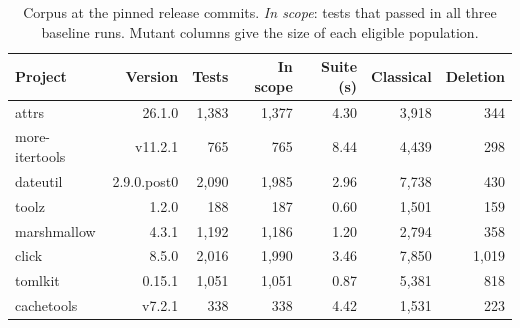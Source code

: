 \begin{table}[t]
\centering\small
\begin{tabular}{lrrrrrr}
\toprule
Project & Version & Tests & In scope & Suite (s) & Classical & Deletion \\
\midrule
attrs & 26.1.0 & 1,383 & 1,377 & 4.30 & 3,918 & 344 \\
more-itertools & v11.2.1 & 765 & 765 & 8.44 & 4,439 & 298 \\
dateutil & 2.9.0.post0 & 2,090 & 1,985 & 2.96 & 7,738 & 430 \\
toolz & 1.2.0 & 188 & 187 & 0.60 & 1,501 & 159 \\
marshmallow & 4.3.1 & 1,192 & 1,186 & 1.20 & 2,794 & 358 \\
click & 8.5.0 & 2,016 & 1,990 & 3.46 & 7,850 & 1,019 \\
tomlkit & 0.15.1 & 1,051 & 1,051 & 0.87 & 5,381 & 818 \\
cachetools & v7.2.1 & 338 & 338 & 4.42 & 1,531 & 223 \\
\bottomrule
\end{tabular}
\caption{Corpus at the pinned release commits. \emph{In scope}: tests that passed in all three baseline runs. Mutant columns give the size of each eligible population.}
\label{tab:corpus}
\end{table}
